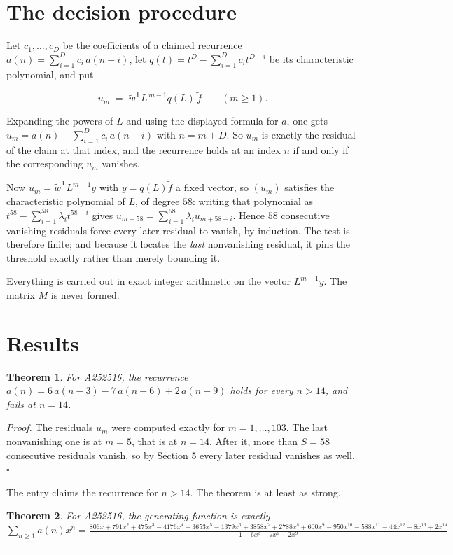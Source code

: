 \documentclass[11pt]{article}
\newtheorem{theorem}{Theorem}
\theoremstyle{definition}
\begin{document}
\section{The decision procedure}

Let $c_1,\dots,c_D$ be the coefficients of a claimed recurrence $a(n) = \sum_{i=1}^{D} c_i\,a(n-i)$, let $q(t) = t^{D} - \sum_{i=1}^{D} c_i t^{D-i}$ be its characteristic polynomial, and put

\[u_m \;=\; \tilde w^{\mathsf T} L^{\,m-1} q(L)\,\tilde f \qquad (m \ge 1).\]

Expanding the powers of $L$ and using the displayed formula for $a$, one gets $u_m = a(n) - \sum_{i=1}^{D} c_i\,a(n-i)$ with $n = m + D$. So $u_m$ is exactly the residual of the claim at that index, and the recurrence holds at an index $n$ if and only if the corresponding $u_m$ vanishes.

Now $u_m = \tilde w^{\mathsf T} L^{m-1} y$ with $y = q(L)\tilde f$ a fixed vector, so $(u_m)$ satisfies the characteristic polynomial of $L$, of degree $58$: writing that polynomial as $t^{58} - \sum_{i=1}^{58} \lambda_i t^{58-i}$ gives $u_{m+58} = \sum_{i=1}^{58} \lambda_i u_{m+58-i}$. Hence $58$ consecutive vanishing residuals force every later residual to vanish, by induction. The test is therefore finite; and because it locates the {\itshape last} nonvanishing residual, it pins the threshold exactly rather than merely bounding it.

Everything is carried out in exact integer arithmetic on the vector $L^{m-1}y$. The matrix $M$ is never formed.

\section{Results}

\begin{theorem} For A252516, the recurrence $a(n) = 6\,a(n-3) - 7\,a(n-6) + 2\,a(n-9)$ holds for every $n > 14$, and fails at $n = 14$.\end{theorem}

{\itshape Proof.} The residuals $u_m$ were computed exactly for $m = 1,\dots,103$. The last nonvanishing one is at $m = 5$, that is at $n = 14$. After it, more than $S = 58$ consecutive residuals vanish, so by Section 5 every later residual vanishes as well. $\square$

The entry claims the recurrence for $n > 14$. The theorem is at least as strong.

\begin{theorem} For A252516, the generating function is exactly $\sum_{n\ge 1} a(n)x^n = \frac{806x + 791x^{2} + 475x^{3} - 4176x^{4} - 3653x^{5} - 1379x^{6} + 3858x^{7} + 2788x^{8} + 600x^{9} - 950x^{10} - 588x^{11} - 44x^{12} - 8x^{13} + 2x^{14}}{1 - 6x^{3} + 7x^{6} - 2x^{9}}$.\end{theorem}
\end{document}
